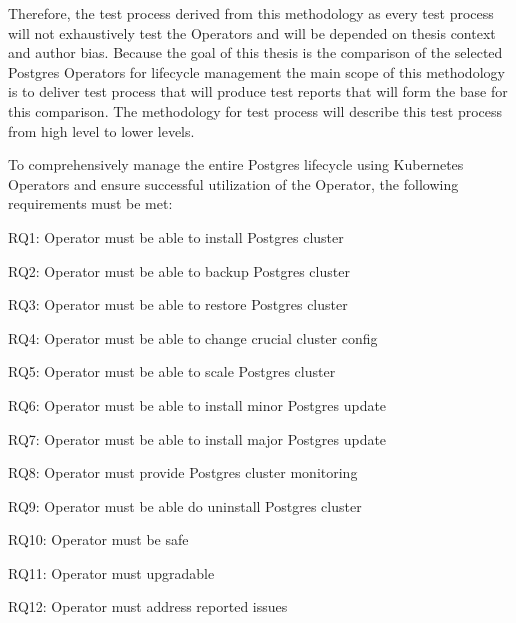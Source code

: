 Therefore, the test process derived from this methodology as every test process will not exhaustively test the Operators and will be depended on thesis context and author bias. Because the goal of this thesis is the comparison of the selected Postgres Operators for lifecycle management the main scope of this methodology is to deliver test process that will produce test reports that will form the base for this comparison. The methodology for test process will describe this test process from high level to lower levels.

To comprehensively manage the entire Postgres lifecycle using Kubernetes Operators and ensure successful utilization of the Operator, the following requirements must be met:

RQ1: Operator must be able to install Postgres cluster

RQ2: Operator must be able to backup Postgres cluster

RQ3: Operator must be able to restore Postgres cluster

RQ4: Operator must be able to change crucial cluster config

RQ5: Operator must be able to scale Postgres cluster

RQ6: Operator must be able to install minor Postgres update

RQ7: Operator must be able to install major Postgres update

RQ8: Operator must provide Postgres cluster monitoring

RQ9: Operator must be able do uninstall Postgres cluster

RQ10: Operator must be safe

RQ11: Operator must upgradable

RQ12: Operator must address reported issues

